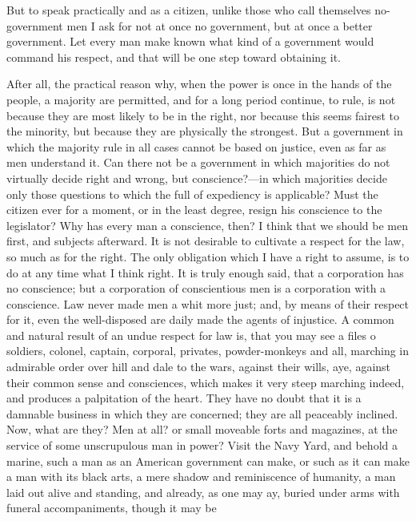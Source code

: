 But to speak practically and as a citizen, unlike those who call
themselves no-government men I ask for not at once no government, but
at once a better government. Let every man make known what kind of a
government would command his respect, and that will be one step toward
obtaining it.\par

After all, the practical reason why, when the power is once in the
hands of the people, a majority are permitted, and for a long period
continue, to rule, is not because they are most likely to be in the
right, nor because this seems fairest to the minority, but because
they are physically the strongest. But a government in which the
majority rule in all cases cannot be based on justice, even as far as
men understand it. Can there not be a government in which majorities
do not virtually decide right and wrong, but conscience?---in which
majorities decide only those questions to which the  full of
expediency is applicable? Must the citizen ever for a moment, or in
the least degree, resign his conscience to the legislator? Why has
every man a conscience, then? I think that we should be men first, and
subjects afterward. It is not desirable to cultivate a respect for the
law, so much as for the right. The only obligation which I have a
right to assume, is to do at any time what I think right. It is truly
enough said, that a corporation has no conscience; but a corporation
of conscientious men is a corporation with a conscience. Law never
made men a whit more just; and, by means of their respect for it, even
the well-disposed are daily made the agents of injustice. A common and
natural result of an undue respect for law is, that you may see a
files o soldiers, colonel, captain, corporal, privates, powder-monkeys
and all, marching in admirable order over hill and dale to the wars,
against their wills, aye, against their common sense and consciences,
which makes it very steep marching indeed, and produces a palpitation
of the heart. They have no doubt that it is a damnable business in
which they are concerned; they are all peaceably inclined. Now, what
are they? Men at all? or small moveable forts and magazines, at the
service of some unscrupulous man in power? Visit the Navy Yard, and
behold a marine, such a man as an American government can make, or
such as it can make a man with its black arts, a mere shadow and
reminiscence of humanity, a man laid out alive and standing, and
already, as one  may ay, buried under arms with funeral
accompaniments, though it may be\par

